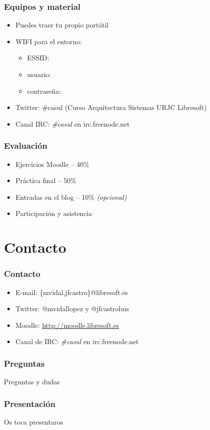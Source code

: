 \documentclass{beamer}
\begin{document}
\begin{frame}
  \frametitle{Equipos y material}
  \begin{itemize}
    \item Puedes traer tu propio portátil
    \item WIFI para el entorno:
      \begin{itemize}
        \item ESSID:   
        \item usuario: 
        \item contraseña: 
      \end{itemize}
    \item Twitter: \#casul (Curso Arquitectura Sistemas URJC Libresoft)
    \item Canal IRC: \textit{\#casul} en irc.freenode.net
  \end{itemize}
\end{frame}

\begin{frame}
  \frametitle{Evaluación}
  \begin{itemize}
    \item Ejercicios Moodle -- 40\%
    \item Práctica final -- 50\%
    \item Entradas en el blog -- 10\% \textit{(opcional)}
    \item Participación y asistencia
  \end{itemize}
\end{frame}


\section{Contacto}
\begin{frame}
  \frametitle{Contacto}
  \begin{itemize}
    \item E-mail: \{mvidal,jfcastro\}@libresoft.es
    \item Twitter: @mvidallopez y @jfcastroluis
    \item Moodle: \url{http://moodle.libresoft.es}
    \item Canal de IRC: \textit{\#casul} en irc.freenode.net
  \end{itemize}
\end{frame}

\begin{frame}
  \frametitle{Preguntas}
  \begin{center}
    \huge{Preguntas y dudas}
  \end{center}
\end{frame}

\begin{frame}
  \frametitle{Presentación}
  \begin{center}
    \huge{Os toca presentaros}
  \end{center}
\end{frame}

\end{document}
